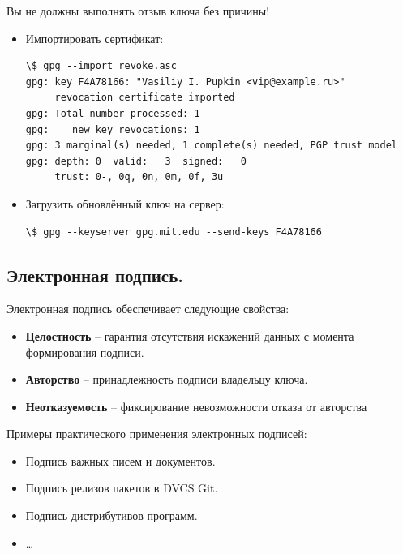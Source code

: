 \documentclass[presentation]{beamer}
\newcommand{\RaisedRightHand}{%
  \raisebox{-.50em}{\Large\HandRight}
}
\newcommand{\EndOfSectionOrnament}{
  \begin{center}
    \pgfornament[width=0.5\textwidth]{88}
    \end{center}
}
\begin{document}
\begin{frame}[fragile]{}
  \RaisedRightHand Вы не должны выполнять отзыв ключа без причины!

  \begin{itemize}
  \item Импортировать сертификат:
    \footnotesize
\begin{Verbatim}[commandchars=\\\[\]]
\$ gpg --import revoke.asc
gpg: key F4A78166: "Vasiliy I. Pupkin <vip@example.ru>"
     revocation certificate imported
gpg: Total number processed: 1
gpg:    new key revocations: 1
gpg: 3 marginal(s) needed, 1 complete(s) needed, PGP trust model
gpg: depth: 0  valid:   3  signed:   0
     trust: 0-, 0q, 0n, 0m, 0f, 3u
\end{Verbatim}
    \normalsize
  \item Загрузить обновлённый ключ на сервер:
    \footnotesize
\begin{Verbatim}[commandchars=\\\[\]]
\$ gpg --keyserver gpg.mit.edu --send-keys F4A78166
\end{Verbatim}
    \normalsize
  \end{itemize}
  \EndOfSectionOrnament
\end{frame}



\subsection{Электронная подпись.}

\begin{frame}[fragile]{}
  Электронная подпись обеспечивает следующие свойства:
  \begin{itemize}
  \item \textbf{Целостность} -- гарантия отсутствия искажений данных с
    момента формирования подписи.
  \item \textbf{Авторство} -- принадлежность подписи владельцу ключа.
  \item \textbf{Неотказуемость} -- фиксирование невозможности отказа от
    авторства
  \end{itemize}

  \vspace{5 mm}

  Примеры практического применения электронных подписей:
  \begin{itemize}
  \item Подпись важных писем и документов.
  \item Подпись релизов пакетов в DVCS Git.
  \item Подпись дистрибутивов программ.
  \item \ldots{}
  \end{itemize}
\end{frame}
\end{document}
